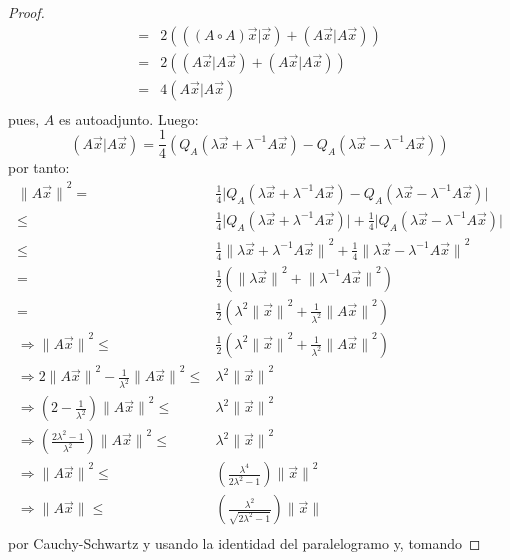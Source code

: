 \documentclass[12pt]{report}
\theoremstyle{largebreak}
\newcommand\abs[1]{\ensuremath{\big|#1\big|}}
\newcommand\pint[2]{\ensuremath{\left(#1\big|#2\right)}}
\newcommand\norm[1]{\ensuremath{\|#1\|}}
\begin{document}
\begin{proof}
\begin{equation*}
\begin{split}
                =&2(\pint{(A\circ A)\vec{x}}{\vec{x}}+\pint{A\vec{x}}{A\vec{x}})\\
                =&2(\pint{A\vec{x}}{A\vec{x}}+\pint{A\vec{x}}{A\vec{x}})\\
                =&4\pint{A\vec{x}}{A\vec{x}}\\
            \end{split}
        \end{equation*}
        pues, $A$ es autoadjunto. Luego:
        \begin{equation*}
            \pint{A\vec{x}}{A\vec{x}}=\frac{1}{4}(Q_A(\lambda\vec{x}+\lambda^{-1}A\vec{x})-Q_A(\lambda\vec{x}-\lambda^{-1}A\vec{x}))
        \end{equation*}
        por tanto:
        \begin{equation*}
            \begin{split}
                \norm{A\vec{x}}^2=&\frac{1}{4}\abs{Q_A(\lambda\vec{x}+\lambda^{-1}A\vec{x})-Q_A(\lambda\vec{x}-\lambda^{-1}A\vec{x})}\\
                \leq&\frac{1}{4}\abs{Q_A(\lambda\vec{x}+\lambda^{-1}A\vec{x})}+\frac{1}{4}\abs{Q_A(\lambda\vec{x}-\lambda^{-1}A\vec{x})}\\
                \leq&\frac{1}{4}\norm{\lambda\vec{x}+\lambda^{-1}A\vec{x}}^2+\frac{1}{4}\norm{\lambda\vec{x}-\lambda^{-1}A\vec{x}}^2 \\
                =&\frac{1}{2}(\norm{\lambda\vec{x}}^2+\norm{\lambda^{-1}A\vec{x}}^2) \\
                =&\frac{1}{2}(\lambda^2\norm{\vec{x}}^2+\frac{1}{\lambda^2}\norm{A\vec{x}}^2) \\
                \Rightarrow \norm{A\vec{x}}^2\leq&\frac{1}{2}(\lambda^2\norm{\vec{x}}^2+\frac{1}{\lambda^2}\norm{A\vec{x}}^2) \\
                \Rightarrow 2\norm{A\vec{x}}^2-\frac{1}{\lambda^2}\norm{A\vec{x}}^2\leq&\lambda^2\norm{\vec{x}}^2\\
                \Rightarrow \left(2-\frac{1}{\lambda^2}\right)\norm{A\vec{x}}^2\leq&\lambda^2\norm{\vec{x}}^2\\
                \Rightarrow \left(\frac{2\lambda^2-1}{\lambda^2}\right)\norm{A\vec{x}}^2\leq&\lambda^2\norm{\vec{x}}^2\\
                \Rightarrow \norm{A\vec{x}}^2\leq&\left(\frac{\lambda^4}{2\lambda^2-1}\right)\norm{\vec{x}}^2\\
                \Rightarrow \norm{A\vec{x}}\leq&\left(\frac{\lambda^2}{\sqrt{2\lambda^2-1}}\right)\norm{\vec{x}}\\
            \end{split}
        \end{equation*}
        por Cauchy-Schwartz y usando la identidad del paralelogramo y, tomando
    \end{proof}
\end{document}
